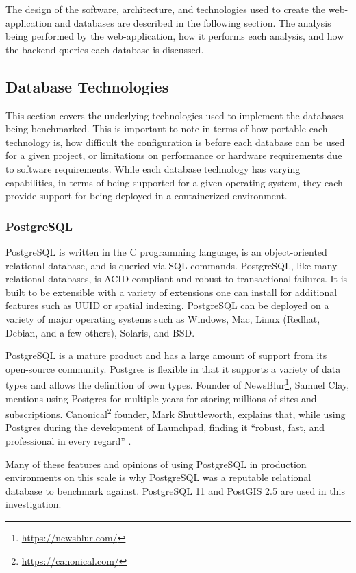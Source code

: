 The design of the software, architecture, and technologies used to create the web-application and databases are described in the following section. The analysis being performed by the web-application, how it performs each analysis, and how the backend queries each database is discussed.

\subsection{Database Technologies}

This section covers the underlying technologies used to implement the databases being benchmarked. This is important to note in terms of how portable each technology is, how difficult the configuration is before each database can be used for a given project, or limitations on performance or hardware requirements due to software requirements. While each database technology has varying capabilities, in terms of being supported for a given operating system, they each provide support for being deployed in a containerized environment.

\subsubsection{PostgreSQL}
PostgreSQL is written in the C programming language, is an object-oriented relational database, and is queried via SQL commands. PostgreSQL, like many relational databases, is ACID-compliant and robust to transactional failures. It is built to be extensible with a variety of extensions one can install for additional features such as UUID or spatial indexing. PostgreSQL can be deployed on a variety of major operating systems such as Windows, Mac, Linux (Redhat, Debian, and a few others), Solaris, and BSD.

PostgreSQL is a mature product and has a large amount of support from its open-source community. Postgres is flexible in that it supports a variety of data types and allows the definition of own types. Founder of NewsBlur\footnote{\url{https://newsblur.com/}}, Samuel Clay, mentions using Postgres for multiple years for storing millions of sites and subscriptions. Canonical\footnote{\url{https://canonical.com/}} founder, Mark Shuttleworth, explains that, while using Postgres during the development of Launchpad, finding it ``robust, fast, and professional in every regard'' \cite{postgres-about}.

Many of these features and opinions of using PostgreSQL in production environments on this scale is why PostgreSQL was a reputable relational database to benchmark against. PostgreSQL 11 and PostGIS 2.5 are used in this investigation.

